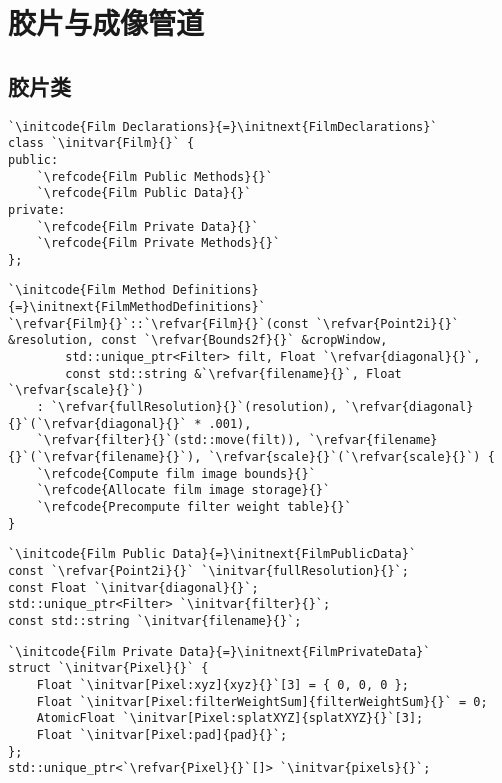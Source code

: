 \section{胶片与成像管道}\label{sec:胶片与成像管道}

\subsection{胶片类}\label{sub:胶片类}

\begin{lstlisting}
`\initcode{Film Declarations}{=}\initnext{FilmDeclarations}`
class `\initvar{Film}{}` {
public:
    `\refcode{Film Public Methods}{}`
    `\refcode{Film Public Data}{}`
private:
    `\refcode{Film Private Data}{}`
    `\refcode{Film Private Methods}{}`
};
\end{lstlisting}

\begin{lstlisting}
`\initcode{Film Method Definitions}{=}\initnext{FilmMethodDefinitions}`
`\refvar{Film}{}`::`\refvar{Film}{}`(const `\refvar{Point2i}{}` &resolution, const `\refvar{Bounds2f}{}` &cropWindow,
        std::unique_ptr<Filter> filt, Float `\refvar{diagonal}{}`,
        const std::string &`\refvar{filename}{}`, Float `\refvar{scale}{}`)
    : `\refvar{fullResolution}{}`(resolution), `\refvar{diagonal}{}`(`\refvar{diagonal}{}` * .001),
    `\refvar{filter}{}`(std::move(filt)), `\refvar{filename}{}`(`\refvar{filename}{}`), `\refvar{scale}{}`(`\refvar{scale}{}`) {
    `\refcode{Compute film image bounds}{}`
    `\refcode{Allocate film image storage}{}`
    `\refcode{Precompute filter weight table}{}`
}
\end{lstlisting}

\begin{lstlisting}
`\initcode{Film Public Data}{=}\initnext{FilmPublicData}`
const `\refvar{Point2i}{}` `\initvar{fullResolution}{}`;
const Float `\initvar{diagonal}{}`;
std::unique_ptr<Filter> `\initvar{filter}{}`;
const std::string `\initvar{filename}{}`;
\end{lstlisting}

\begin{lstlisting}
`\initcode{Film Private Data}{=}\initnext{FilmPrivateData}`
struct `\initvar{Pixel}{}` {
    Float `\initvar[Pixel:xyz]{xyz}{}`[3] = { 0, 0, 0 };
    Float `\initvar[Pixel:filterWeightSum]{filterWeightSum}{}` = 0;
    AtomicFloat `\initvar[Pixel:splatXYZ]{splatXYZ}{}`[3];
    Float `\initvar[Pixel:pad]{pad}{}`;
};
std::unique_ptr<`\refvar{Pixel}{}`[]> `\initvar{pixels}{}`;
\end{lstlisting}

